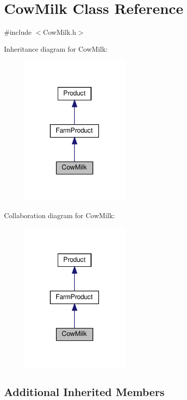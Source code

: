 \hypertarget{classCowMilk}{}\section{Cow\+Milk Class Reference}
\label{classCowMilk}


{\ttfamily \#include $<$Cow\+Milk.\+h$>$}



Inheritance diagram for Cow\+Milk\+:
\nopagebreak
\begin{figure}[H]
\begin{center}
\leavevmode
\includegraphics[width=153pt]{classCowMilk__inherit__graph}
\end{center}
\end{figure}


Collaboration diagram for Cow\+Milk\+:
\nopagebreak
\begin{figure}[H]
\begin{center}
\leavevmode
\includegraphics[width=153pt]{classCowMilk__coll__graph}
\end{center}
\end{figure}
\subsection*{Additional Inherited Members}


